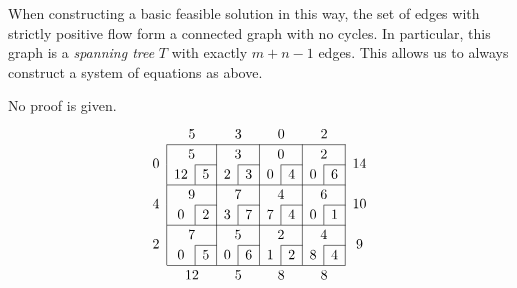 \begin{theorem}
	When constructing a basic feasible solution in this way, the set of edges with strictly positive flow form a connected graph with no cycles.
	In particular, this graph is a \textit{spanning tree} \( T \) with exactly \( m + n - 1 \) edges.
	This allows us to always construct a system of equations as above.
\end{theorem}
No proof is given.
\[
	\arraycolsep=5pt\def\arraystretch{1.2}
	\begin{array}{c|c|c|c|c|c|c|c|c|c}
		\multicolumn{1}{c}{}   & \multicolumn{2}{c}{5}   & \multicolumn{2}{c}{3}  & \multicolumn{2}{c}{0}  & \multicolumn{2}{c}{2}  & \multicolumn{1}{c}{}                                       \\\cline{2-9}
		\multirow{2}{*}{\(0\)} & \multicolumn{2}{c|}{5}  & \multicolumn{2}{c|}{3} & \multicolumn{2}{c|}{0} & \multicolumn{2}{c|}{2} & \multirow{2}{*}{\(14\)}                                    \\\cline{3-3}\cline{5-5}\cline{7-7}\cline{9-9}
		                       & \multicolumn{1}{c|}{12} & 5                      & \multicolumn{1}{c|}{2} & 3                      & \multicolumn{1}{c|}{0}  & 4 & \multicolumn{1}{c|}{0} & 6 & \\\cline{2-9}
		\multirow{2}{*}{\(4\)} & \multicolumn{2}{c|}{9}  & \multicolumn{2}{c|}{7} & \multicolumn{2}{c|}{4} & \multicolumn{2}{c|}{6} & \multirow{2}{*}{\(10\)}                                    \\\cline{3-3}\cline{5-5}\cline{7-7}\cline{9-9}
		                       & \multicolumn{1}{c|}{0}  & 2                      & \multicolumn{1}{c|}{3} & 7                      & \multicolumn{1}{c|}{7}  & 4 & \multicolumn{1}{c|}{0} & 1 & \\\cline{2-9}
		\multirow{2}{*}{\(2\)} & \multicolumn{2}{c|}{7}  & \multicolumn{2}{c|}{5} & \multicolumn{2}{c|}{2} & \multicolumn{2}{c|}{4} & \multirow{2}{*}{\(9\)}                                     \\\cline{3-3}\cline{5-5}\cline{7-7}\cline{9-9}
		                       & \multicolumn{1}{c|}{0}  & 5                      & \multicolumn{1}{c|}{0} & 6                      & \multicolumn{1}{c|}{1}  & 2 & \multicolumn{1}{c|}{8} & 4 & \\\cline{2-9}
		\multicolumn{1}{c}{}   & \multicolumn{2}{c}{12}  & \multicolumn{2}{c}{5}  & \multicolumn{2}{c}{8}  & \multicolumn{2}{c}{8}  & \multicolumn{1}{c}{}
	\end{array}
\]

